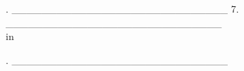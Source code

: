 \begin{titlepage}
\begin{spacing}{1}
. \_\_\_\_\_\_\_\_\_\_\_\_\_\_\_\_\_\_\_\_\_\_\_\_\_\_\_\_\_  \hfill  7. \_\_\_\_\_\_\_\_\_\_\_\_\_\_\_\_\_\_\_\_\_\_\_\_\_\_\_\_\_ \\
 in



. \_\_\_\_\_\_\_\_\_\_\_\_\_\_\_\_\_\_\_\_\_\_\_\_\_\_\_\_\_  



\end{spacing}

\end{titlepage}





\mbox{}
\thispagestyle{empty}
\newpage

